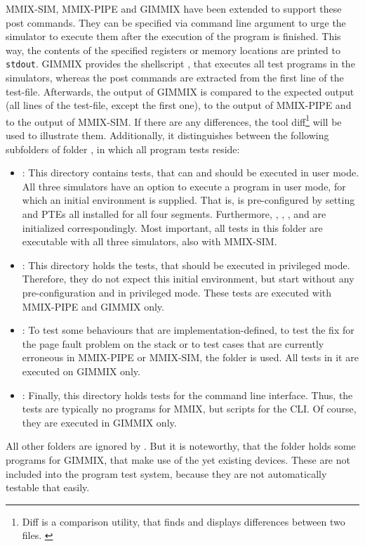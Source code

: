 MMIX-SIM, MMIX-PIPE and GIMMIX have been extended to support these post commands. They can be specified via command line argument to urge the simulator to execute them after the execution of the program is finished. This way, the contents of the specified registers or memory locations are printed to {\tt stdout}. GIMMIX provides the shellscript , that executes all test programs in the simulators, whereas the post commands are extracted from the first line of the test-file. Afterwards, the output of GIMMIX is compared to the expected output (all lines of the test-file, except the first one), to the output of MMIX-PIPE and to the output of MMIX-SIM. If there are any differences, the tool diff\footnote{Diff is a comparison utility, that finds and displays differences between two files. \citep{gldiff}} will be used to illustrate them. Additionally, it distinguishes between the following subfolders of folder , in which all program tests reside:
\begin{itemize}
	\item {}: This directory contains tests, that can and should be executed in user mode. All three simulators have an option to execute a program in user mode, for which an initial environment is supplied. That is,  is pre-configured by setting  and PTEs all installed for all four segments. Furthermore, , , ,  and  are initialized correspondingly. Most important, all tests in this folder are executable with all three simulators, \ie also with MMIX-SIM.
	\item {}: This directory holds the tests, that should be executed in privileged mode. Therefore, they do not expect this initial environment, but start without any pre-configuration and in privileged mode. These tests are executed with MMIX-PIPE and GIMMIX only.
	\item {}: To test some behaviours that are implementation-defined, to test the fix for the page fault problem on the stack or to test cases that are currently erroneous in MMIX-PIPE or MMIX-SIM, the folder  is used. All tests in it are executed on GIMMIX only.
	\item {}: Finally, this directory holds tests for the command line interface. Thus, the tests are typically no programs for MMIX, but scripts for the CLI. Of course, they are executed in GIMMIX only.
\end{itemize}
All other folders are ignored by . But it is noteworthy, that the folder  holds some programs for GIMMIX, that make use of the yet existing devices. These are not included into the program test system, because they are not automatically testable that easily.

